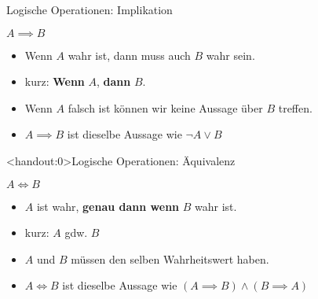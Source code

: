 \begin{frame}{Logische Operationen: Implikation}
\begin{alertblock}{$A\implies B$}
\begin{itemize}
    \item \glqq Wenn $A$ wahr ist, dann muss auch $B$ wahr sein.\grqq
    \item kurz: \glqq\textbf{Wenn} $A$, \textbf{dann} $B$.\grqq
    \item Wenn $A$ falsch ist können wir keine Aussage über $B$ treffen.
    \item $A\implies B$ ist dieselbe Aussage wie $\neg A \vee B$
\end{itemize}
\end{alertblock}
\end{frame}

\begin{frame}<handout:0>{Logische Operationen: Äquivalenz}
\begin{alertblock}{$A\iff B$}
\begin{itemize}
    \item \glqq $A$ ist wahr, \textbf{genau dann wenn} $B$ wahr ist.\grqq
    \item kurz: \glqq $A$ gdw. $B$\grqq
    \item $A$ und $B$ müssen den selben Wahrheitswert haben.
    \item $A\iff B$ ist dieselbe Aussage wie $(A \implies B) \wedge (B \implies A)$
\end{itemize}
\end{alertblock}
\end{frame}

